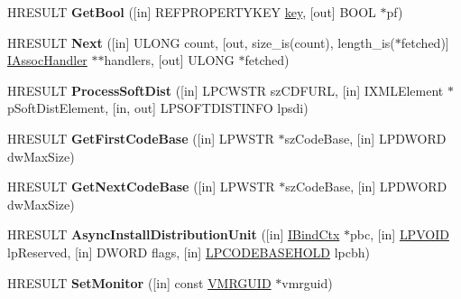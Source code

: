 \begin{DoxyCompactItemize}
\mbox{\label{interfaceenum_aaba3b29b548896b1c93b056b0b02aaed}} 
H\+R\+E\+S\+U\+LT {\bfseries Get\+Bool} (\mbox{[}in\mbox{]} R\+E\+F\+P\+R\+O\+P\+E\+R\+T\+Y\+K\+EY \hyperlink{structkey}{key}, \mbox{[}out\mbox{]} B\+O\+OL $\ast$pf)
\item 
\mbox{\label{interfaceenum_aa7ec1394f659ba3c4145cbb04345ce1c}} 
H\+R\+E\+S\+U\+LT {\bfseries Next} (\mbox{[}in\mbox{]} U\+L\+O\+NG count, \mbox{[}out, size\+\_\+is(count), length\+\_\+is($\ast$fetched)\mbox{]} \hyperlink{interface_i_assoc_handler}{I\+Assoc\+Handler} $\ast$$\ast$handlers, \mbox{[}out\mbox{]} U\+L\+O\+NG $\ast$fetched)
\item 
\mbox{\label{interfaceenum_aba49e88c3be9eccf92ac79b143a7878c}} 
H\+R\+E\+S\+U\+LT {\bfseries Process\+Soft\+Dist} (\mbox{[}in\mbox{]} L\+P\+C\+W\+S\+TR sz\+C\+D\+F\+U\+RL, \mbox{[}in\mbox{]} I\+X\+M\+L\+Element $\ast$p\+Soft\+Dist\+Element, \mbox{[}in, out\mbox{]} L\+P\+S\+O\+F\+T\+D\+I\+S\+T\+I\+N\+FO lpsdi)
\item 
\mbox{\label{interfaceenum_ae8220f53fb0efcc96bf3f26527668c72}} 
H\+R\+E\+S\+U\+LT {\bfseries Get\+First\+Code\+Base} (\mbox{[}in\mbox{]} L\+P\+W\+S\+TR $\ast$sz\+Code\+Base, \mbox{[}in\mbox{]} L\+P\+D\+W\+O\+RD dw\+Max\+Size)
\item 
\mbox{\label{interfaceenum_a9443f64a4e906c05d4f106c97bdf27e0}} 
H\+R\+E\+S\+U\+LT {\bfseries Get\+Next\+Code\+Base} (\mbox{[}in\mbox{]} L\+P\+W\+S\+TR $\ast$sz\+Code\+Base, \mbox{[}in\mbox{]} L\+P\+D\+W\+O\+RD dw\+Max\+Size)
\item 
\mbox{\label{interfaceenum_a8bd20923d41566d0c5f4c4c6c126a072}} 
H\+R\+E\+S\+U\+LT {\bfseries Async\+Install\+Distribution\+Unit} (\mbox{[}in\mbox{]} \hyperlink{interface_i_bind_ctx}{I\+Bind\+Ctx} $\ast$pbc, \mbox{[}in\mbox{]} \hyperlink{interfacevoid}{L\+P\+V\+O\+ID} lp\+Reserved, \mbox{[}in\mbox{]} D\+W\+O\+RD flags, \mbox{[}in\mbox{]} \hyperlink{struct__tag_c_o_d_e_b_a_s_e_h_o_l_d}{L\+P\+C\+O\+D\+E\+B\+A\+S\+E\+H\+O\+LD} lpcbh)
\item 
\mbox{\label{interfaceenum_a8a8e9d190b4c69e17e866f6b9b5be3d3}} 
H\+R\+E\+S\+U\+LT {\bfseries Set\+Monitor} (\mbox{[}in\mbox{]} const \hyperlink{structtag_v_m_r_g_u_i_d}{V\+M\+R\+G\+U\+ID} $\ast$vmrguid)
$$
\end{DoxyCompactItemize}
